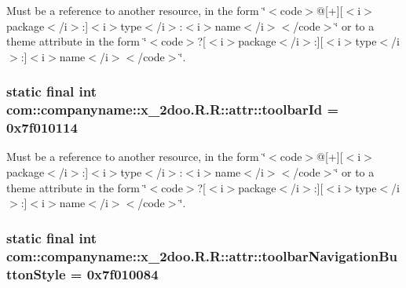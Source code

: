 Must be a reference to another resource, in the form \char`\"{}$<$code$>$@\mbox{[}+\mbox{]}\mbox{[}$<$i$>$package$<$/i$>$:\mbox{]}$<$i$>$type$<$/i$>$:$<$i$>$name$<$/i$>$$<$/code$>$\char`\"{} or to a theme attribute in the form \char`\"{}$<$code$>$?\mbox{[}$<$i$>$package$<$/i$>$:\mbox{]}\mbox{[}$<$i$>$type$<$/i$>$:\mbox{]}$<$i$>$name$<$/i$>$$<$/code$>$\char`\"{}. \hypertarget{classcom_1_1companyname_1_1x__2doo_1_1_r_1_1attr_fd9b34624e9d0708534d23b4f1752285}{
\subsubsection[{toolbarId}]{\setlength{\rightskip}{0pt plus 5cm}static final int com::companyname::x\_\-2doo.R.R::attr::toolbarId = 0x7f010114}}
\label{classcom_1_1companyname_1_1x__2doo_1_1_r_1_1attr_fd9b34624e9d0708534d23b4f1752285}


Must be a reference to another resource, in the form \char`\"{}$<$code$>$@\mbox{[}+\mbox{]}\mbox{[}$<$i$>$package$<$/i$>$:\mbox{]}$<$i$>$type$<$/i$>$:$<$i$>$name$<$/i$>$$<$/code$>$\char`\"{} or to a theme attribute in the form \char`\"{}$<$code$>$?\mbox{[}$<$i$>$package$<$/i$>$:\mbox{]}\mbox{[}$<$i$>$type$<$/i$>$:\mbox{]}$<$i$>$name$<$/i$>$$<$/code$>$\char`\"{}. \hypertarget{classcom_1_1companyname_1_1x__2doo_1_1_r_1_1attr_80b08220a3c645e21c79e7965119576e}{
\subsubsection[{toolbarNavigationButtonStyle}]{\setlength{\rightskip}{0pt plus 5cm}static final int com::companyname::x\_\-2doo.R.R::attr::toolbarNavigationButtonStyle = 0x7f010084}}
\label{classcom_1_1companyname_1_1x__2doo_1_1_r_1_1attr_80b08220a3c645e21c79e7965119576e}



